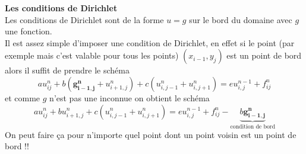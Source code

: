 \documentclass[11pt,a4paper]{article}
\begin{document}
\noindent\textbf{Les conditions de Dirichlet}\\
Les conditions de Dirichlet sont de la forme $u = g$ sur le bord du domaine avec $g$ une fonction.\\
Il est assez simple d'imposer une condition de Dirichlet, en effet si le point (par exemple mais c'est valable pour tous les points) $(x_{i-1}, y_{j})$ est un point de bord alors
il suffit de prendre le schéma
\begin{equation}
    au_{ij}^n + b\left(\boldsymbol{g_{i-1, j}^n} + u_{i+1, j}^n\right) +  c\left(u_{i, j-1}^n + u_{i, j+1}^n\right) = e u_{i, j}^{n-1} + f_{ij}^n
\end{equation}
et comme $g$ n'est pas une inconnue on obtient le schéma
\begin{equation}
    au_{ij}^n + bu_{i+1, j}^n +  c\left(u_{i, j-1}^n + u_{i, j+1}^n\right) = e u_{i, j}^{n-1} + f_{ij}^n - \underbrace{b\boldsymbol{g_{i-1, j}^n}}_{\text{condition de bord}}
\end{equation}
On peut faire ça pour n'importe quel point dont un point voisin est un point de bord !!\\
\end{document}
